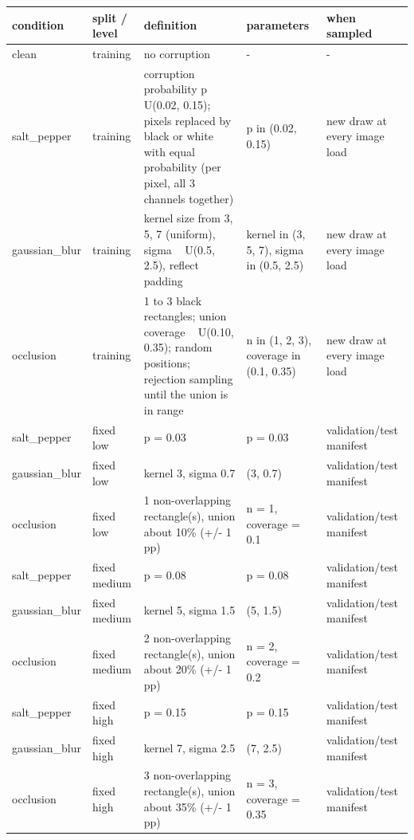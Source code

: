 \begin{tabular}{lllll}
\hline
condition & split / level & definition & parameters & when sampled \\
\hline
clean & training & no corruption & - & - \\
salt\_pepper & training & corruption probability p ~ U(0.02, 0.15); pixels replaced by black or white with equal probability (per pixel, all 3 channels together) & p in (0.02, 0.15) & new draw at every image load \\
gaussian\_blur & training & kernel size from {3, 5, 7} (uniform), sigma ~ U(0.5, 2.5), reflect padding & kernel in (3, 5, 7), sigma in (0.5, 2.5) & new draw at every image load \\
occlusion & training & 1 to 3 black rectangles; union coverage ~ U(0.10, 0.35); random positions; rejection sampling until the union is in range & n in (1, 2, 3), coverage in (0.1, 0.35) & new draw at every image load \\
salt\_pepper & fixed low & p = 0.03 & p = 0.03 & validation/test manifest \\
gaussian\_blur & fixed low & kernel 3, sigma 0.7 & (3, 0.7) & validation/test manifest \\
occlusion & fixed low & 1 non-overlapping rectangle(s), union about 10\% (+/- 1 pp) & n = 1, coverage = 0.1 & validation/test manifest \\
salt\_pepper & fixed medium & p = 0.08 & p = 0.08 & validation/test manifest \\
gaussian\_blur & fixed medium & kernel 5, sigma 1.5 & (5, 1.5) & validation/test manifest \\
occlusion & fixed medium & 2 non-overlapping rectangle(s), union about 20\% (+/- 1 pp) & n = 2, coverage = 0.2 & validation/test manifest \\
salt\_pepper & fixed high & p = 0.15 & p = 0.15 & validation/test manifest \\
gaussian\_blur & fixed high & kernel 7, sigma 2.5 & (7, 2.5) & validation/test manifest \\
occlusion & fixed high & 3 non-overlapping rectangle(s), union about 35\% (+/- 1 pp) & n = 3, coverage = 0.35 & validation/test manifest \\
\hline
\end{tabular}
